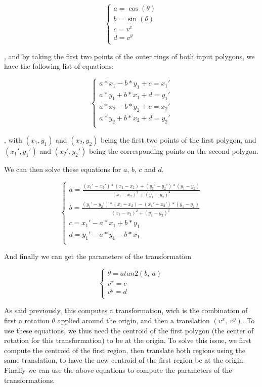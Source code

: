 \[
    \begin{cases}
        a = \cos(\theta) \\
        b = \sin(\theta) \\
        c = v^x          \\
        d = v^y          \\
    \end{cases}
\]

, and by taking the first two points of the outer rings of both input polygons, we have the following list of equations:

\[
    \begin{cases}
        a*x_1 - b*y_1 + c = x_1' \\
        a*y_1 + b*x_1 + d = y_1' \\
        a*x_2 - b*y_2 + c = x_2' \\
        a*y_2 + b*x_2 + d = y_2' \\
    \end{cases}
\]

, with $(x_1, y_1)$ and $(x_2, y_2)$ being the first two points of the first polygon, and $(x_1', y_1')$ and $(x_2', y_2')$ being the corresponding points on the second polygon.

We can then solve these equations for $a$, $b$, $c$ and $d$.

\[
    \begin{cases}
        a = \frac{(x_1' - x_2')*(x_1 - x_2) + (y_1' - y_2')*(y_1 - y_2)}{(x_1 - x_2)^2 + (y_1 - y_2)^2}\\
        b = \frac{(y_1' - y_2')*(x_1 - x_2) - (x_1' - x_2')*(y_1 - y_2)}{(x_1 - x_2)^2 + (y_1 - y_2)^2}\\
        c = x_1' - a*x_1 + b*y_1 \\
        d = y_1' - a*y_1 - b*x_1 \\
    \end{cases}
\]

And finally we can get the parameters of the transformation

\[
    \begin{cases}
        \theta = atan2(b,\ a) \\
        v^x = c \\
        v^y = d \\
    \end{cases}
\]

As said previously, this computes a transformation, wich is the combination of first a rotation $\theta$ applied around the origin, and then a translation $(v^x,\ v^y)$. To use these equations, we thus need the centroid of the first polygon (the center of rotation for this transformation) to be at the origin. To solve this issue, we first compute the centroid of the first region, then translate both regions using the same translation, to have the new centroid of the first region be at the origin. Finally we can use the above equations to compute the parameters of the transformations.

